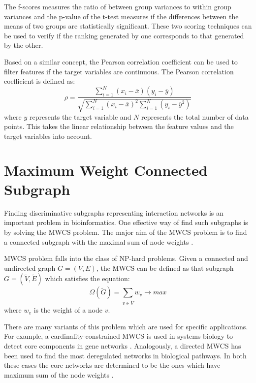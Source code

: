 \documentclass[msthesis.tex]{subfiles}
\begin{document}
The f-scores measures the ratio of between group variances to within group variances and the p-value of the t-test measures if the differences between the means of two groups are statistically significant. These two scoring techniques can be used to verify if the ranking generated by one corresponds to that generated by the other.

Based on a similar concept, the Pearson correlation coefficient can be used to filter features if the target variables are continuous. The Pearson correlation coefficient is defined as: 
\begin{equation}
    \rho = \frac{\sum_{i=1}^{N} (x_{i} - \overline{x}) (y_{i} - \overline{y})}
    {\sqrt{\sum_{i=1}^{N} (x_{i}-\overline{x})^2 \sum_{i=1}^{N} (y_{i}-\overline{y}^2)}}
\end{equation}
where $y$ represents the target variable and $N$ represents the total number of data points. This takes the linear relationship between the feature values and the target variables into account.

\section[MWCS]{Maximum Weight Connected Subgraph}
\label{sec:MEWS}
Finding discriminative subgraphs representing interaction networks is an important problem in bioinformatics. One effective way of find such subgraphs is by solving the \gls{MWCS} problem. The major aim of the \gls{MWCS} problem is to find a connected subgraph with the maximal sum of node weights \citep{DBLP:journals/corr/LobodaAS16}.

\gls{MWCS} problem falls into the class of NP-hard problems. Given a connected and undirected graph $G=(V,E)$, the \gls{MWCS} can be defined as that subgraph $G=(\tilde{V}, \tilde{E})$ which satisfies the equation:
\begin{equation}
    \Omega (\tilde{G}) = \sum_{v \in \tilde{V}} w_v \longrightarrow max
\end{equation}
where $w_v$ is the weight of a node $v$.

There are many variants of this problem which are used for specific applications. For example, a cardinality-constrained \gls{MWCS} is used in systems biology to detect core components in gene networks \citep{yamamoto2009better}. Analogously, a directed \gls{MWCS} has been used to find the most deregulated networks in biological pathways. In both these cases the core networks are determined to be the ones which have maximum sum of the node weights \citep{backes2012integer}.
\end{document}
